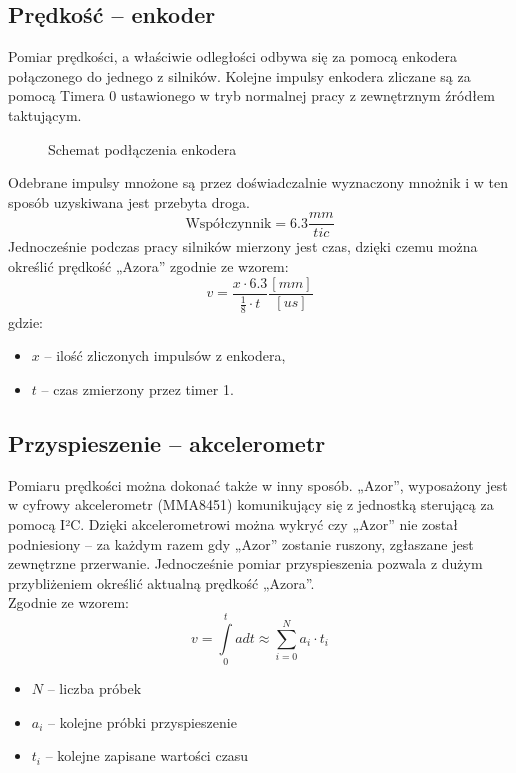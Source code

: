     \subsection{Prędkość -- enkoder}
        \tab Pomiar prędkości, a właściwie odległości odbywa się za pomocą enkodera połączonego do jednego z silników.
        Kolejne impulsy enkodera zliczane są za pomocą Timera 0 ustawionego w tryb normalnej pracy z zewnętrznym źródłem taktującym.  %
        \begin{figure}[!h]
            \centering
            \begin{tikzpicture}
                
            \end{tikzpicture}
            \caption{Schemat podłączenia enkodera}
        \end{figure}
        Odebrane impulsy mnożone są przez doświadczalnie wyznaczony mnożnik i w ten sposób uzyskiwana jest przebyta droga.
        \begin{equation*}
            \text{Współczynnik} = 6.3 \frac{mm}{tic}
        \end{equation*}
        Jednocześnie podczas pracy silników mierzony jest czas, dzięki czemu można określić prędkość „Azora” zgodnie ze wzorem:
        \begin{equation*}
            v = \frac{x\cdot 6.3}{\frac{1}{8}\cdot t}\frac{[mm]}{[us]}
        \end{equation*}
        gdzie:
        \begin{itemize}
            \item $x$ -- ilość zliczonych impulsów z enkodera,
            \item $t$ -- czas zmierzony przez timer 1.
        \end{itemize}
        
    \subsection{Przyspieszenie -- akcelerometr}
        \tab Pomiaru prędkości można dokonać także w inny sposób.
        „Azor”, wyposażony jest w cyfrowy akcelerometr (MMA8451) komunikujący się z jednostką sterującą za pomocą I²C.
        Dzięki akcelerometrowi można wykryć czy „Azor” nie został podniesiony -- za każdym razem gdy „Azor” zostanie ruszony, zgłaszane jest zewnętrzne przerwanie. 
        Jednocześnie pomiar przyspieszenia pozwala z dużym przybliżeniem określić aktualną prędkość „Azora”.\\
        Zgodnie ze wzorem:
        \begin{equation*}
            v = \int\limits_{0}^{t} a dt \approx \sum_{i = 0}^{N} a_i \cdot t_i
        \end{equation*}
        \begin{itemize}
            \item $N$ -- liczba próbek
            \item $a_i$ -- kolejne próbki przyspieszenie
            \item $t_i$ -- kolejne zapisane wartości czasu
        \end{itemize}

